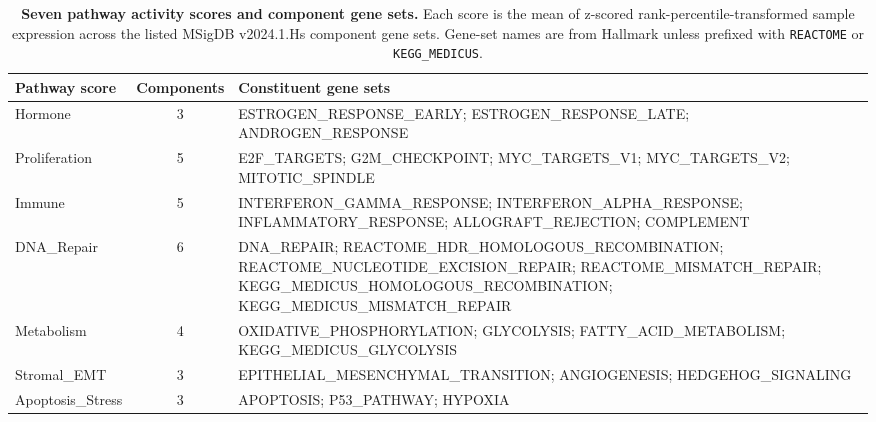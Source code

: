 \documentclass[11pt,letterpaper]{article}
\begin{document}
\begin{table}[H]
\caption{\textbf{Seven pathway activity scores and component gene sets.} Each score is the mean of z-scored rank-percentile-transformed sample expression across the listed MSigDB v2024.1.Hs component gene sets. Gene-set names are from Hallmark unless prefixed with \texttt{REACTOME} or \texttt{KEGG\_MEDICUS}.}
\label{tab:pathways}
\small
\begin{tabularx}{\textwidth}{lcX}
\toprule
\textbf{Pathway score} & \textbf{Components} & \textbf{Constituent gene sets} \\
\midrule
Hormone & 3 & ESTROGEN\_RESPONSE\_EARLY; ESTROGEN\_RESPONSE\_LATE; ANDROGEN\_RESPONSE \\
Proliferation & 5 & E2F\_TARGETS; G2M\_CHECKPOINT; MYC\_TARGETS\_V1; MYC\_TARGETS\_V2; MITOTIC\_SPINDLE \\
Immune & 5 & INTERFERON\_GAMMA\_RESPONSE; INTERFERON\_ALPHA\_RESPONSE; INFLAMMATORY\_RESPONSE; ALLOGRAFT\_REJECTION; COMPLEMENT \\
DNA\_Repair & 6 & DNA\_REPAIR; REACTOME\_HDR\_HOMOLOGOUS\_RECOMBINATION; REACTOME\_NUCLEOTIDE\_EXCISION\_REPAIR; REACTOME\_MISMATCH\_REPAIR; KEGG\_MEDICUS\_HOMOLOGOUS\_RECOMBINATION; KEGG\_MEDICUS\_MISMATCH\_REPAIR \\
Metabolism & 4 & OXIDATIVE\_PHOSPHORYLATION; GLYCOLYSIS; FATTY\_ACID\_METABOLISM; KEGG\_MEDICUS\_GLYCOLYSIS \\
Stromal\_EMT & 3 & EPITHELIAL\_MESENCHYMAL\_TRANSITION; ANGIOGENESIS; HEDGEHOG\_SIGNALING \\
Apoptosis\_Stress & 3 & APOPTOSIS; P53\_PATHWAY; HYPOXIA \\
\bottomrule
\end{tabularx}
\end{table}
\end{document}
